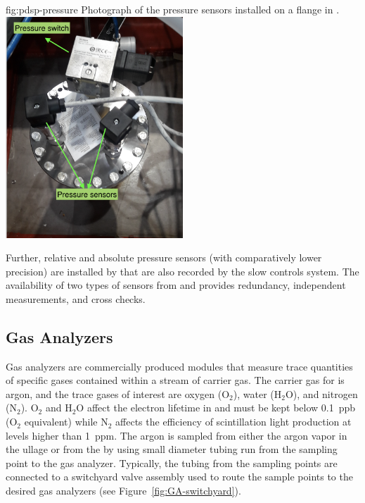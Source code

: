 \begin{dunefigure}{fig:pdsp-pressure}
  {Photograph of the pressure sensors installed on a flange in .}
  \includegraphics[width=0.5\textwidth]{graphics/cisc-pdsp-pressure-meters}
\end{dunefigure}

Further, relative and absolute pressure sensors (with comparatively lower precision) are installed by  that are also recorded by the slow controls system. The availability of two types of sensors from  and  provides redundancy, independent measurements, and cross checks.

\subsection{Gas Analyzers}
\label{sec:fdgen-slow-cryo-gas-anlyz}


 Gas analyzers are commercially produced modules that measure trace quantities of specific gases contained within a stream of carrier gas. The carrier gas for  is argon, and the trace gases of interest are oxygen ($\text{O}_2$), water ($\text{H}_2\text{O}$), and nitrogen ($\text{N}_2$). $\text{O}_2$ and $\text{H}_2\text{O}$ affect the electron lifetime in  and must be kept below \SI{0.1}{ppb} ($\text{O}_2$ equivalent) while $\text{N}_2$ affects the efficiency of scintillation light production at levels higher than \SI{1}{ppm}.
The argon is sampled from either the argon vapor in the ullage or from the  by using small diameter tubing run from the sampling point to the gas analyzer. Typically, the tubing from the sampling points are connected to a switchyard valve assembly used to route the sample points to the desired gas analyzers (see Figure~\ref{fig:GA-switchyard}).


